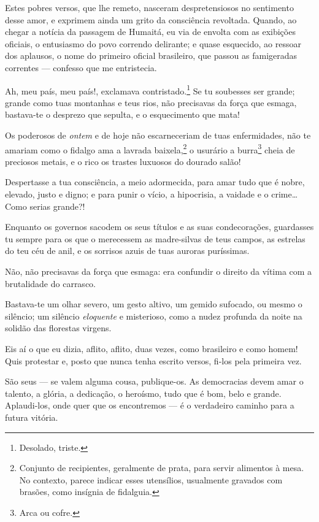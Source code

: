 {Estes pobres versos, que lhe remeto, nasceram despretensiosos no
sentimento desse amor, e exprimem ainda um grito da consciência
revoltada. Quando, ao chegar a notícia da passagem de Humaitá, eu via de
envolta com as exibições oficiais, o entusiasmo do povo correndo
delirante; e quase esquecido, ao ressoar dos aplausos, o nome do
primeiro oficial brasileiro, que passou as famigeradas correntes ---
confesso que me entristecia.

Ah, meu país, meu país!, exclamava contristado.\footnote{Desolado,
  triste.} Se tu soubesses ser grande; grande como tuas montanhas e
teus rios, não precisavas da força que esmaga, bastava-te o desprezo que
sepulta, e o esquecimento que mata!

Os poderosos de \emph{ontem} e de hoje não escarneceriam de tuas
enfermidades, não te amariam como o fidalgo ama a lavrada
baixela,\footnote{Conjunto de recipientes, geralmente de prata, para
  servir alimentos à mesa. No contexto, parece indicar esses utensílios,
  usualmente gravados com brasões, como insígnia de fidalguia.} o
usurário a burra\footnote{Arca ou cofre.} cheia de preciosos metais, e
o rico os trastes luxuosos do dourado salão!

Despertasse a tua consciência, a meio adormecida, para amar tudo que é
nobre, elevado, justo e digno; e para punir o vício, a hipocrisia, a
vaidade e o crime\ldots{} Como serias grande?!

Enquanto os governos sacodem os seus títulos e as suas condecorações,
guardasses tu sempre para os que o merecessem as madre-silvas de teus
campos, as estrelas do teu céu de anil, e os sorrisos azuis de tuas
auroras puríssimas.

Não, não precisavas da força que esmaga: era confundir o direito da
vítima com a brutalidade do carrasco.

Bastava-te um olhar severo, um gesto altivo, um gemido sufocado, ou
mesmo o silêncio; um silêncio \emph{eloquente} e misterioso, como a
nudez profunda da noite na solidão das florestas virgens.

Eis aí o que eu dizia, aflito, aflito, duas vezes, como brasileiro e
como homem! Quis protestar e, posto que nunca tenha escrito versos,
fi-los pela primeira vez.

São seus --- se valem alguma cousa, publique-os. As democracias devem
amar o talento, a glória, a dedicação, o heroísmo, tudo que é bom, belo
e grande. Aplaudi-los, onde quer que os encontremos --- é o verdadeiro
caminho para a futura vitória.

}
